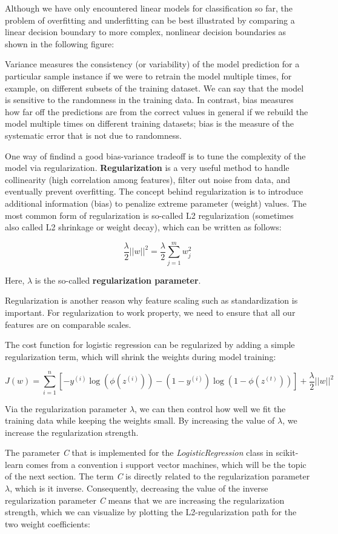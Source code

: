 \documentclass[11pt]{article}
\begin{document}
Although we have only encountered linear models for classification so
far, the problem of overfitting and underfitting can be best illustrated
by comparing a linear decision boundary to more complex, nonlinear
decision boundaries as shown in the following figure:

    Variance measures the consistency (or variability) of the model
prediction for a particular sample instance if we were to retrain the
model multiple times, for example, on different subsets of the training
dataset. We can say that the model is sensitive to the randomness in the
training data. In contrast, bias measures how far off the predictions
are from the correct values in general if we rebuild the model multiple
times on different training datasets; bias is the measure of the
systematic error that is not due to randomness.

    One way of findind a good bias-variance tradeoff is to tune the
complexity of the model via regularization. \textbf{Regularization} is a
very useful method to handle collinearity (high correlation among
features), filter out noise from data, and eventually prevent
overfitting. The concept behind regularization is to introduce
additional information (bias) to penalize extreme parameter (weight)
values. The most common form of regularization is so-called L2
regularization (sometimes also called L2 shrinkage or weight decay),
which can be written as follows:

\[\frac{\lambda}{2}\vert\vert w\vert\vert^2 = \frac{\lambda}{2}\sum_{j=1}^m w_j^2\]

Here, \(\lambda\) is the so-called \textbf{regularization parameter}.

    Regularization is another reason why feature scaling such as
standardization is important. For regularization to work property, we
need to ensure that all our features are on comparable scales.

The cost function for logistic regression can be regularized by adding a
simple regularization term, which will shrink the weights during model
training:

\[J(w) = \sum_{i = 1}^n [-y^{(i)} \log(\phi(z^{(i)})) - (1 - y^{(i)}) \log(1 - \phi(z^{(t)}))] + \frac{\lambda}{2}\vert\vert w\vert\vert^2\]

Via the regularization parameter \(\lambda\), we can then control how
well we fit the training data while keeping the weights small. By
increasing the value of \(\lambda\), we increase the regularization
strength.

The parameter \emph{C} that is implemented for the
\emph{LogisticRegression} class in scikit-learn comes from a convention
i support vector machines, which will be the topic of the next section.
The term \emph{C} is directly related to the regularization parameter
\(\lambda\), which is it inverse. Consequently, decreasing the value of
the inverse regularization parameter \emph{C} means that we are
increasing the regularization strength, which we can visualize by
plotting the L2-regularization path for the two weight coefficients:
\end{document}
